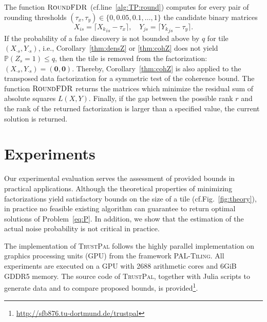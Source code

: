 The function $\textsc{RoundFDR}$ (cf.\@ line~\ref{alg:TP:round}) computes for every pair of rounding thresholds $(\tau_x,\tau_y)\in\{0,0.05,0.1,\ldots,1\}$ the candidate binary matrices 
\[X_{is}=\lceil {X_k}_{is}-\tau_x\rceil,\quad Y_{js}=\lceil {Y_k}_{js}-\tau_y\rceil.\]
If the probability of a false discovery is not bounded above by $q$ for tile $(X_{\cdot s},Y_{\cdot s})$, i.e., Corollary~\ref{thm:densZ} or \ref{thm:cohZ} does not yield $\mathbb{P}(Z_s=1)\leq q$, then the tile is removed from the factorization:
$(X_{\cdot s},Y_{\cdot s})=(\mathbf{0},\mathbf{0})$.
Thereby, Corollary~\ref{thm:cohZ} is also applied to the transposed data factorization for a symmetric test of the coherence bound. The function $\textsc{RoundFDR}$ returns the matrices which minimize the residual sum of absolute squares $L(X,Y)$.
Finally, if the gap between the possible rank $r$ and the rank of the returned factorization is larger than a specified value, the current solution is returned.
\section{Experiments}\label{sec:TP:experiments}
Our experimental evaluation serves the assessment of provided bounds in practical applications. Although the theoretical properties of minimizing factorizations yield satisfactory bounds on the size of a tile (cf.\@ Fig.~\ref{fig:theory}), in practice no feasible existing algorithm can guarantee to return optimal solutions of Problem~\eqref{eq:P}. 
In addition, we show that the estimation of the actual noise probability is not critical in practice.

The implementation of \textsc{TrustPal} follows the highly parallel implementation on graphics processing units (GPU) from the framework \textsc{PAL-Tiling}. All experiments are executed on a GPU with 2688 arithmetic cores and 6GiB GDDR5 memory. The source code of \textsc{TrustPal}, together with Julia scripts to generate data and to compare proposed bounds, is provided\footnote{\url{http://sfb876.tu-dortmund.de/trustpal}}.


